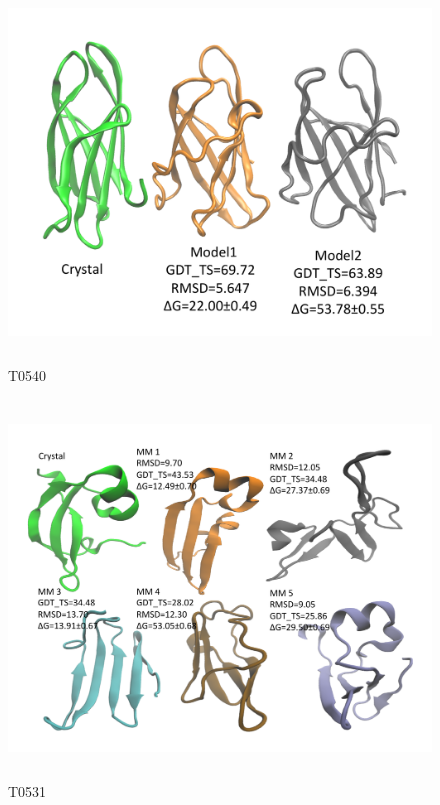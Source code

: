 \documentclass[12pt]{article}
\begin{document}
\begin{figure}
\begin{center}
\includegraphics[width=12cm,height=10cm]{T0540.pdf}
\end{center}
\caption{T0540}
\label{fig:T0540}
\end{figure}

\begin{figure}
\begin{center}
\includegraphics[width=12cm,height=10cm]{T0531.pdf}
\end{center}
\caption{T0531}
\label{fig:T0531}
\end{figure}
\end{document}
